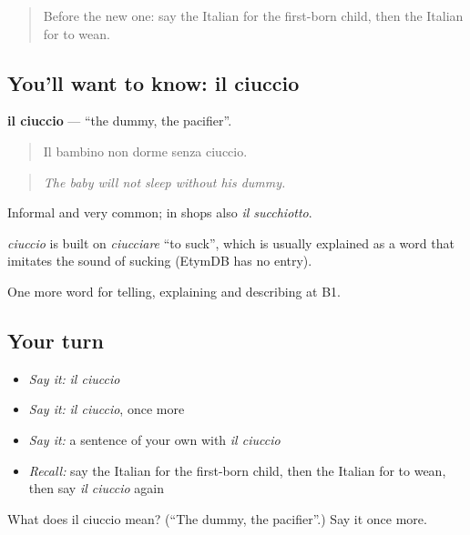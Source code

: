\label{lesson:IT-C307-ciuccio}



\begin{quote}
Before the new one: say the Italian for the first-born child, then the Italian for to wean.
\end{quote}

\subsection*{You'll want to know: il ciuccio}
\textbf{il ciuccio} — \textquotedblleft{}the dummy, the pacifier\textquotedblright{}.

\begin{quote}
Il bambino non dorme senza ciuccio.
\end{quote}

\begin{quote}
\emph{The baby will not sleep without his dummy.}
\end{quote}

Informal and very common; in shops also \emph{il succhiotto}.

\begin{cousinweb}
\emph{ciuccio} is built on \emph{ciucciare} \textquotedblleft{}to suck\textquotedblright{}, which is usually explained as a word that imitates the sound of sucking (EtymDB has no entry).
\end{cousinweb}

\begin{grammarlens}[title={What you've built}]
One more word for telling, explaining and describing at B1.
\end{grammarlens}

\subsection*{Your turn}
\begin{itemize}
\raggedright
  \item \emph{Say it:} \emph{il ciuccio}
  \item \emph{Say it:} \emph{il ciuccio}, once more
  \item \emph{Say it:} a sentence of your own with \emph{il ciuccio}
  \item \emph{Recall:} say the Italian for the first-born child, then the Italian for to wean, then say \emph{il ciuccio} again
\end{itemize}

\begin{tcolorbox}[breakable,colback=teal!4,colframe=teal!35!black,title={Before you move on}]
What does il ciuccio mean? (\textquotedblleft{}The dummy, the pacifier\textquotedblright{}.) Say it once more.
\end{tcolorbox}
